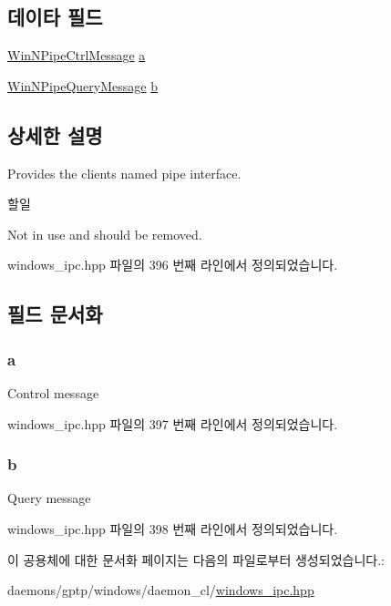 \subsection*{데이타 필드}
\begin{DoxyCompactItemize}
\item 
\hyperlink{class_win_n_pipe_ctrl_message}{Win\+N\+Pipe\+Ctrl\+Message} \hyperlink{union_windows_n_pipe_msg_client_a2c5bdff15863825fe5e03c9f4db3c609}{a}
\item 
\hyperlink{class_win_n_pipe_query_message}{Win\+N\+Pipe\+Query\+Message} \hyperlink{union_windows_n_pipe_msg_client_a216f92e6225b78315f4786ad809a8500}{b}
\end{DoxyCompactItemize}


\subsection{상세한 설명}
Provides the client\textquotesingle{}s named pipe interface. 

\begin{DoxyRefDesc}{할일}
\item[\hyperlink{todo__todo000027}{할일}]Not in use and should be removed. \end{DoxyRefDesc}


windows\+\_\+ipc.\+hpp 파일의 396 번째 라인에서 정의되었습니다.



\subsection{필드 문서화}
\subsubsection[{\texorpdfstring{a}{a}}]{ a}\hypertarget{union_windows_n_pipe_msg_client_a2c5bdff15863825fe5e03c9f4db3c609}{}\label{union_windows_n_pipe_msg_client_a2c5bdff15863825fe5e03c9f4db3c609}
Control message 

windows\+\_\+ipc.\+hpp 파일의 397 번째 라인에서 정의되었습니다.

\subsubsection[{\texorpdfstring{b}{b}}]{ b}\hypertarget{union_windows_n_pipe_msg_client_a216f92e6225b78315f4786ad809a8500}{}\label{union_windows_n_pipe_msg_client_a216f92e6225b78315f4786ad809a8500}
Query message 

windows\+\_\+ipc.\+hpp 파일의 398 번째 라인에서 정의되었습니다.



이 공용체에 대한 문서화 페이지는 다음의 파일로부터 생성되었습니다.\+:\begin{DoxyCompactItemize}
\item 
daemons/gptp/windows/daemon\+\_\+cl/\hyperlink{windows__ipc_8hpp}{windows\+\_\+ipc.\+hpp}\end{DoxyCompactItemize}
